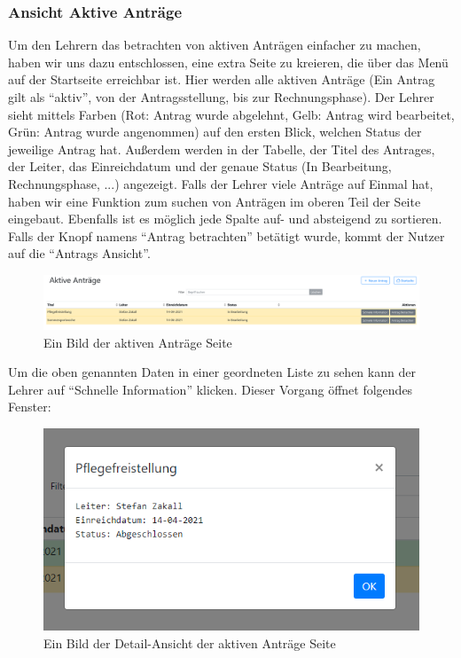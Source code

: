 \subsubsection{Ansicht Aktive Anträge}
Um den Lehrern das betrachten von aktiven Anträgen einfacher zu machen, haben wir uns dazu entschlossen, eine extra Seite zu kreieren, die über das Menü auf der Startseite erreichbar ist. Hier werden alle aktiven Anträge (Ein Antrag gilt als \enquote{aktiv}, von der Antragsstellung, bis zur Rechnungsphase). Der Lehrer sieht mittels Farben (Rot: Antrag wurde abgelehnt, Gelb: Antrag wird bearbeitet, Grün: Antrag wurde angenommen) auf den ersten Blick, welchen Status der jeweilige Antrag hat. Außerdem werden in der Tabelle, der Titel des Antrages, der Leiter, das Einreichdatum und der genaue Status (In Bearbeitung, Rechnungsphase, ...) angezeigt. Falls der Lehrer viele Anträge auf Einmal hat, haben wir eine Funktion zum suchen von Anträgen im oberen Teil der Seite eingebaut. Ebenfalls ist es möglich jede Spalte auf- und absteigend zu sortieren. Falls der Knopf namens \enquote{Antrag betrachten} betätigt wurde, kommt der Nutzer auf die \enquote{Antrags Ansicht}.
\begin{figure}[H]
	\centering
	\includegraphics[width=1\linewidth]{images/website/aktiv}
	\caption[Aktiv]{Ein Bild der aktiven Anträge Seite}
	\label{fig:antragaktiv}
\end{figure}
Um die oben genannten Daten in einer geordneten Liste zu sehen kann der Lehrer auf \enquote{Schnelle Information} klicken. Dieser Vorgang öffnet folgendes Fenster:
\begin{figure}[H]
	\centering
	\includegraphics[width=0.6\linewidth]{images/website/aktiv_detail}
	\caption[Aktiv]{Ein Bild der Detail-Ansicht der aktiven Anträge Seite}
	\label{fig:antragaktivdetail}
\end{figure}
